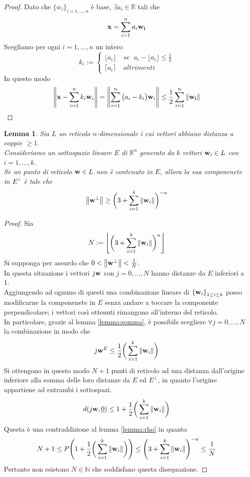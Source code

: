 \documentclass[a4paper,11pt,openright,twoside	]{book}
\newtheorem{lemma}[theorem]{Lemma}
\begin{document}
\begin{proof}
Dato che $\{w_i \}_{i=1,...,n}$ è base, $\exists a_i \in \mathbb{R}$ tali che 
\[\vb{x} = \sum_{i=1}^{n} a_i \vb{w_i} \]
Scegliamo per ogni $i= 1,...,n$ un intero 
\[ k_i := \begin{cases} 
\lfloor a_i \rfloor \;  & se \; \; a_i - \lfloor a_i \rfloor \leq \frac{1}{2} \\
\lceil a_i \rceil \; & altrimenti
\end{cases}\]
In questo modo 
\[ \norm{\vb{x} - \sum_{i=1}^{n} k_i \vb{w}_i} = \norm{\sum_{i=1}^{n} \big(a_i - k_i \big)\vb{w}_i} \leq  \frac{1}{2} \sum_{i=1}^{n} \norm{\vb{w_i}}  \]
\end{proof}
\begin{lemma}
\label{lemma:somma2}
Sia $L$ un reticolo $n$-dimensionale i cui vettori abbiano distanza a coppie $\geq 1$. \\ Consideriamo un sottospazio lineare $E$ di $\mathbb{R}^n$ generato da $k$ vettori $\vb{w}_i \in L$ con $i = 1,... ,k$. \\
Se un punto di reticolo $\vb{w} \in L$ non è contenuto in $E$, allora la sua componenete in $E^{\perp}$ è tale che 
\[ \norm{\vb{w}^{\perp}} \geq \bigg( 3 +  \sum_{i = 1}^{k} \norm{\vb{w}_i} \bigg)^{-n} \]
\end{lemma}
\begin{proof}
Sia \[ N := \left\lfloor
\bigg( 3 +  \sum_{i = 1}^{k} \norm{\vb{w}_i} \bigg)^{n}
\right\rfloor\]
Si supponga per assurdo che $0 < \norm{\vb{w}^{\perp}}  < \frac{1}{N}$. \\
In questa situazione i vettori $j \vb{w}$ con $j = 0, ..., N$ hanno distanze da $E$ inferiori a 1. \\
Aggiungendo ad ognuno di questi una combinazione lineare di ${\{\vb{w}_i\}}_{1 \leq i \leq k }$ posso modificarne la componenete in $E$ senza andare a toccare la componente perpendicolare; i vettori così ottenuti rimangono all'interno del reticolo. \\
In particolare, grazie al lemma \ref{lemma:somma}, è possibile scegliere $\forall j = 0, ..., N$ la combinazione in modo che \[ j \vb{w}^{E} \leq \frac{1}{2} \bigg( \sum_{i = 1}^{k} \norm{\vb{w}_i} \bigg)  \]  
Si ottengono in questo modo $N+1$ punti di reticolo ad una distanza dall'origine inferiore alla somma delle loro distanze da $E$ ed $E^{\perp}$, in quanto l'origine appartiene ad entrambi i sottospazi.
\[ d(j\vb{w}, \underline{0} ) \leq 1 + \frac{1}{2} \bigg( \sum_{i = 1}^{k} \norm{\vb{w}_i} \bigg) \]
Questa è una contraddizione al lemma \ref{lemma:rho} in quanto 
\[ N+1 \leq P \Bigg( 1 + \frac{1}{2} \bigg( \sum_{i = 1}^{k} \norm{\vb{w}_i} \bigg) \Bigg)  \leq \Bigg( 3 +  \sum_{i = 1}^{k} \norm{\vb{w}_i} \Bigg)^{-n} \leq  \frac{1}{N} \]
Pertanto non esistono $N \in \mathbb{N}$ che soddisfano questa disequazione.
\end{proof}
\end{document}
